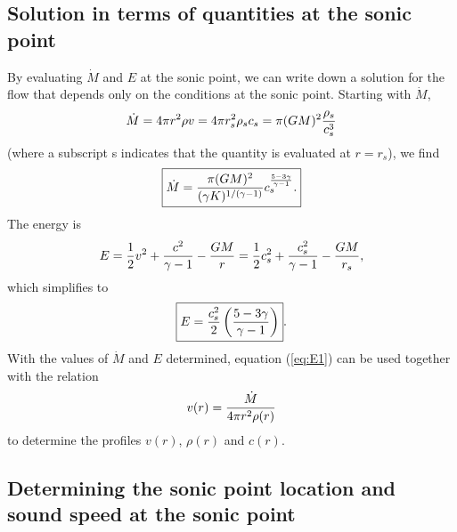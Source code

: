 \documentclass[preprint,12pt]{aastex}
\begin{document}
\subsection{Solution in terms of quantities at the sonic point}

By evaluating $\dot M$ and $E$ at the sonic point, we can write down a solution for the flow that depends only on the conditions at the sonic point. Starting with $\dot M$,
\begin{equation}
\dot M = 4\pi r^2 \rho v = 4\pi r_s^2 \rho_s c_s = \pi (GM)^2 {\rho_s\over c_s^3}
\end{equation}
(where a subscript s indicates that the quantity is evaluated at $r=r_s$), we find
\begin{equation}
\boxed{
\dot M =  {\pi (GM)^2\over (\gamma K)^{1/(\gamma-1)}} c_s^{5-3\gamma\over \gamma-1}.
}
\end{equation}
The energy is
\begin{equation}\label{eq:E1}
E = {1\over 2}v^2 + {c^2\over \gamma-1} -{GM\over r} = {1\over 2}c_s^2 + {c_s^2\over \gamma-1} -{GM\over r_s},
\end{equation}
which simplifies to
\begin{equation}
\boxed{
E = {c_s^2\over 2}\left({5-3\gamma\over \gamma-1}\right)
}.
\end{equation}
With the values of $\dot M$ and $E$ determined, equation (\ref{eq:E1}) can be used together with the relation
\begin{equation}
v(r) = {\dot M\over 4\pi r^2\rho(r)}
\end{equation}
to determine the profiles $v(r)$, $\rho(r)$ and $c(r)$.

\subsection{Determining the sonic point location and sound speed at the sonic point}
\end{document}
